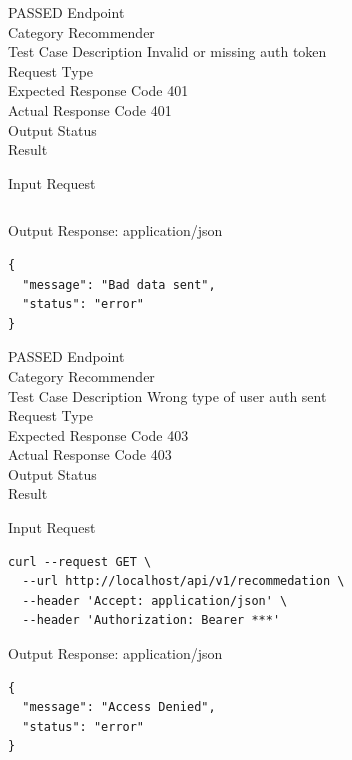 \begin{testcase}{58}{PASSED}
Endpoint \hfill {}\\
Category \hfill Recommender\\
Test Case Description \hfill Invalid or missing auth token\\

Request Type    \hfill {}\\
Expected Response Code    \hfill 401\\
Actual Response Code    \hfill 401\\

Output Status \hfill {}\\
Result \hfill {}

\begin{ipblock}{Input Request}
\begin{verbatim}

\end{verbatim}
\end{ipblock}

\begin{opblock}{Output Response: application/json}
\begin{verbatim}
{
  "message": "Bad data sent",
  "status": "error"
}
\end{verbatim}
\end{opblock}
\end{testcase}

\begin{testcase}{59}{PASSED}
Endpoint \hfill {}\\
Category \hfill Recommender\\
Test Case Description \hfill Wrong type of user auth sent\\

Request Type    \hfill {}\\
Expected Response Code    \hfill 403\\
Actual Response Code    \hfill 403\\

Output Status \hfill {}\\
Result \hfill {}

\begin{ipblock}{Input Request}
\begin{verbatim}
curl --request GET \
  --url http://localhost/api/v1/recommedation \
  --header 'Accept: application/json' \
  --header 'Authorization: Bearer ***'
\end{verbatim}
\end{ipblock}

\begin{opblock}{Output Response: application/json}
\begin{verbatim}
{
  "message": "Access Denied",
  "status": "error"
}
\end{verbatim}
\end{opblock}
\end{testcase}

